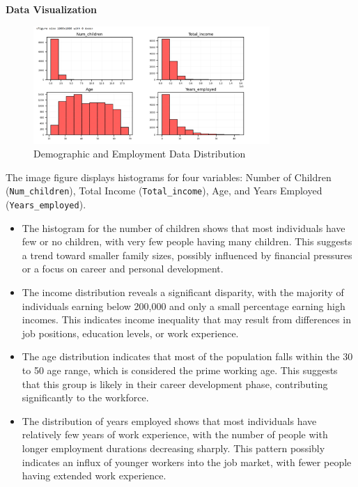 \documentclass[12pt]{report}
\begin{document}
    {\bfseries Data Visualization}

    \begin{figure}[h!]
        \centering
        \includegraphics[width=0.8\textwidth]{resources/pic/Demographic and Employment Data Distribution.png}
        \caption{Demographic and Employment Data Distribution}
        \label{Demographic and Employment Data Distribution}
    \end{figure}

    The image figure displays histograms for four variables: Number of Children (\texttt{Num\_children}), Total Income (\texttt{Total\_income}), Age, and Years Employed (\texttt{Years\_employed}).

    \begin{itemize}
        \item The histogram for the number of children shows that most individuals have few or no children, with very few people having many children. This suggests a trend toward smaller family sizes, possibly influenced by financial pressures or a focus on career and personal development.
        \item The income distribution reveals a significant disparity, with the majority of individuals earning below 200,000 and only a small percentage earning high incomes. This indicates income inequality that may result from differences in job positions, education levels, or work experience.
        \item The age distribution indicates that most of the population falls within the 30 to 50 age range, which is considered the prime working age. This suggests that this group is likely in their career development phase, contributing significantly to the workforce.
        \item The distribution of years employed shows that most individuals have relatively few years of work experience, with the number of people with longer employment durations decreasing sharply. This pattern possibly indicates an influx of younger workers into the job market, with fewer people having extended work experience.
    \end{itemize}
\end{document}
